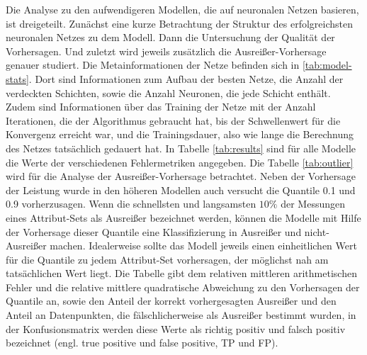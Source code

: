 \documentclass[
	12pt,
	a4paper,
	BCOR10mm,
	DIV14,
	listof=totoc,
	bibliography=totoc,
	headsepline
]{scrreprt}
\begin{document}
Die Analyse zu den aufwendigeren Modellen, die auf neuronalen Netzen basieren, ist dreigeteilt. 
Zunächst eine kurze Betrachtung der Struktur des erfolgreichsten neuronalen Netzes zu dem Modell. 
Dann die Untersuchung der Qualität der Vorhersagen.
Und zuletzt wird jeweils zusätzlich die Ausreißer-Vorhersage genauer studiert.
Die Metainformationen der Netze befinden sich in \ref{tab:model-stats}. Dort sind Informationen zum Aufbau der besten Netze, die Anzahl der verdeckten Schichten, sowie die Anzahl Neuronen, die jede Schicht enthält. Zudem sind Informationen über das Training der Netze mit der Anzahl Iterationen, die der Algorithmus gebraucht hat, bis der Schwellenwert für die Konvergenz erreicht war, und die Trainingsdauer, also wie lange die Berechnung des Netzes tatsächlich gedauert hat.
In Tabelle \ref{tab:results} sind für alle Modelle die Werte der verschiedenen Fehlermetriken angegeben.
Die Tabelle \ref{tab:outlier} wird für die Analyse der Ausreißer-Vorhersage betrachtet.
Neben der Vorhersage der Leistung wurde in den höheren Modellen auch versucht die Quantile 0.1 und 0.9 vorherzusagen. Wenn die schnellsten und langsamsten $10\%$ der Messungen eines Attribut-Sets als Ausreißer bezeichnet werden, können die Modelle mit Hilfe der Vorhersage dieser Quantile eine Klassifizierung in Ausreißer und nicht-Ausreißer machen. Idealerweise sollte das Modell jeweils einen einheitlichen Wert für die Quantile zu jedem Attribut-Set vorhersagen, der möglichst nah am tatsächlichen Wert liegt. 
Die Tabelle gibt dem relativen mittleren arithmetischen Fehler und die relative mittlere quadratische Abweichung zu den Vorhersagen der Quantile an, sowie den Anteil der korrekt vorhergesagten Ausreißer und den Anteil an Datenpunkten, die fälschlicherweise als Ausreißer bestimmt wurden, in der Konfusionsmatrix werden diese Werte als richtig positiv und falsch positiv bezeichnet (engl. true positive und false positive, TP und FP).
\end{document}
